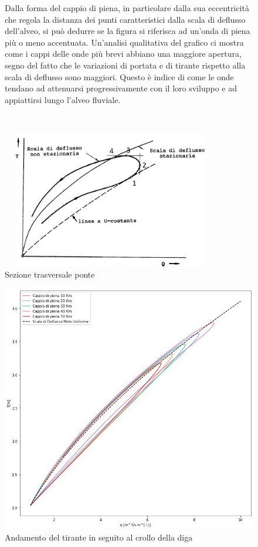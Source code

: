 \documentclass[12pt]{article} %
\begin{document}
\begin{figure}[H]
\begin{minipage}[b]{8.5cm}
\noindent Dalla forma del cappio di piena, in particolare dalla sua eccentricità che regola la distanza dei punti caratteristici dalla scala di deflusso dell'alveo, si può dedurre se la figura si riferisca ad un'onda di piena più o meno accentuata.
Un'analisi qualitativa del grafico ci mostra come i cappi delle onde più brevi abbiano una maggiore apertura, segno del fatto che le variazioni di portata e di tirante rispetto alla scala di deflusso sono maggiori. Questo è indice di come le onde tendano ad attenuarsi progressivamente con il loro sviluppo e ad appiattirsi lungo l'alveo fluviale.
\end{minipage}
\ \hspace{2mm} \hspace{3mm} \
\begin{minipage}[b]{10.5cm}
    \centering
    \includegraphics[height=6cm, width=9.5cm]{Punticappio.png}
    \caption{Sezione trasversale ponte}
\end{minipage}
\end{figure}

\begin{figure} [H]
    \centering
    \includegraphics[scale=0.5,width=18cm]{Cappio.png}
    \caption{Andamento del tirante in seguito al crollo della diga}
    \label{fig:cappio}
\end{figure}
\end{document}
